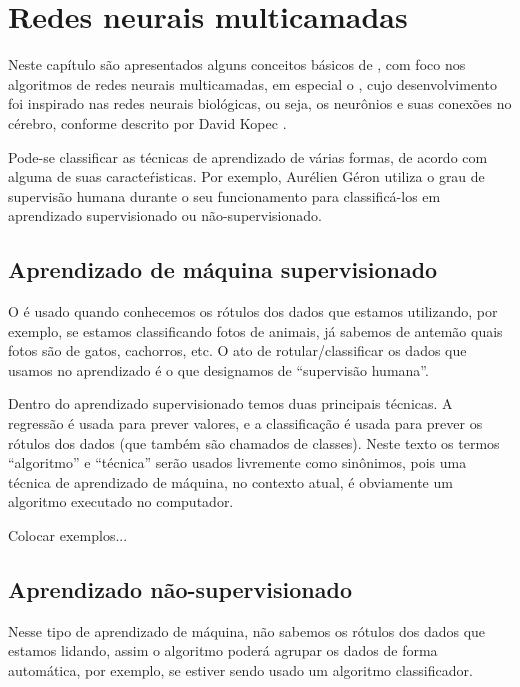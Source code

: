 
\chapter{Redes neurais multicamadas}

Neste capítulo são apresentados alguns conceitos básicos de , com foco nos algoritmos de redes neurais multicamadas, em especial o , cujo desenvolvimento foi inspirado nas redes neurais biológicas, ou seja, os neurônios e suas conexões no cérebro, conforme descrito por David Kopec \citep{classic}.

Pode-se classificar as técnicas de aprendizado de várias formas, de acordo com alguma de suas caracteŕisticas. Por exemplo, Aurélien Géron \citep{hands} utiliza o grau de supervisão humana durante o seu funcionamento para classificá-los em aprendizado supervisionado ou não-supervisionado.

\section{Aprendizado de máquina supervisionado}

 O  é usado quando conhecemos os rótulos dos dados que estamos utilizando, por exemplo, se estamos classificando fotos de animais, já sabemos de antemão quais fotos são de gatos, cachorros, etc. O ato de rotular/classificar os dados que usamos no aprendizado é o que designamos de ``supervisão humana''.

Dentro do aprendizado supervisionado temos duas principais técnicas. A regressão é usada para prever valores, e a classificação é usada para prever os rótulos dos dados (que também são chamados de classes). Neste texto os termos ``algoritmo'' e ``técnica'' serão usados livremente como sinônimos, pois uma técnica de aprendizado de máquina, no contexto atual, é obviamente um algoritmo executado no computador.

Colocar exemplos...

\section{Aprendizado não-supervisionado}

Nesse tipo de aprendizado de máquina, não sabemos os rótulos dos dados que estamos lidando, assim o algoritmo poderá agrupar os dados de forma automática, por exemplo, se estiver sendo usado um algoritmo classificador.

